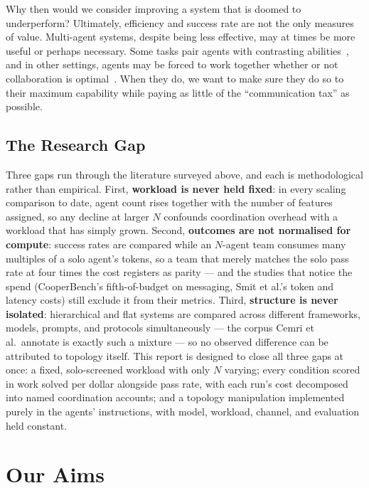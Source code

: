 \documentclass[11pt,a4paper]{article}
\begin{document}
Why then would we consider improving a system that is doomed to underperform? Ultimately, efficiency and success rate are not the only measures of value. Multi-agent systems, despite being less effective, may at times be more useful or perhaps necessary. Some tasks pair agents with contrasting abilities~\cite{lowe2017maddpg}, and in other settings, agents may be forced to work together whether or not collaboration is optimal~\cite{stone2010adhoc}. When they do, we want to make sure they do so to their maximum capability while paying as little of the ``communication tax'' as possible.

\subsection{The Research Gap}\label{sec:gap}

Three gaps run through the literature surveyed above, and each is methodological rather than empirical. First, \textbf{workload is never held fixed}: in every scaling comparison to date, agent count rises together with the number of features assigned, so any decline at larger $N$ confounds coordination overhead with a workload that has simply grown. Second, \textbf{outcomes are not normalised for compute}: success rates are compared while an $N$-agent team consumes many multiples of a solo agent's tokens, so a team that merely matches the solo pass rate at four times the cost registers as parity --- and the studies that notice the spend (CooperBench's fifth-of-budget on messaging, Smit et al.'s token and latency costs) still exclude it from their metrics. Third, \textbf{structure is never isolated}: hierarchical and flat systems are compared across different frameworks, models, prompts, and protocols simultaneously --- the corpus Cemri et al.\ annotate is exactly such a mixture --- so no observed difference can be attributed to topology itself. This report is designed to close all three gaps at once: a fixed, solo-screened workload with only $N$ varying; every condition scored in work solved per dollar alongside pass rate, with each run's cost decomposed into named coordination accounts; and a topology manipulation implemented purely in the agents' instructions, with model, workload, channel, and evaluation held constant.

%
%
\section{Our Aims}\label{sec:aims}
\end{document}
